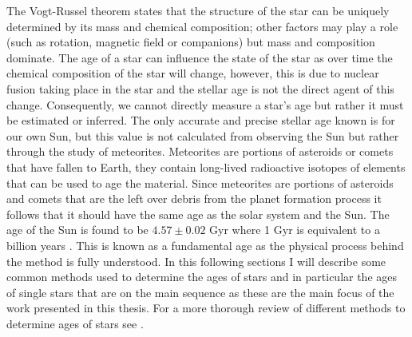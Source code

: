 The Vogt-Russel theorem states that the structure of the star can be uniquely determined by its mass and chemical composition; other factors may play a role (such as rotation, magnetic field or companions) but mass and composition dominate. The age of a star can influence the state of the star as over time the chemical composition of the star will change, however, this is due to nuclear fusion taking place in the star and the stellar age is not the direct agent of this change. Consequently, we cannot directly measure a star's age but rather it must be estimated or inferred. The only accurate and precise stellar age known is for our own Sun, but this value is not calculated from observing the Sun but rather through the study of meteorites. Meteorites are portions of asteroids or comets that have fallen to Earth, they contain long-lived radioactive isotopes of elements that can be used to age the material. Since meteorites are portions of asteroids and comets that are the left over debris from the planet formation process it follows that it should have the same age as the solar system and the Sun. The age of the Sun is found to be $4.57 \pm 0.02$ Gyr  where 1 Gyr is equivalent to a billion years \citep{Bahcall_etal_1995}. This is known as a fundamental age as the physical process behind the method is fully understood. In this following sections I will describe some common methods used to determine the ages of stars and in particular the ages of single stars that are on the main sequence as these are the main focus of the work presented in this thesis. For a more thorough review of different methods to determine ages of stars see \citet{Soderblom_2010}.

